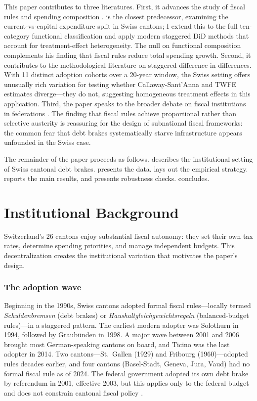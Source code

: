 \documentclass[12pt]{article}
\begin{document}
This paper contributes to three literatures. First, it advances the study of fiscal rules and spending composition \citep{baskaran2016revenue, poterba1994state, alesina2008fiscal}. \citet{baskaran2016revenue} is the closest predecessor, examining the current-vs-capital expenditure split in Swiss cantons; I extend this to the full ten-category functional classification and apply modern staggered DiD methods that account for treatment-effect heterogeneity. The null on functional composition complements his finding that fiscal rules reduce total spending growth. Second, it contributes to the methodological literature on staggered difference-in-differences. With 11 distinct adoption cohorts over a 20-year window, the Swiss setting offers unusually rich variation for testing whether Callaway-Sant'Anna and TWFE estimates diverge---they do not, suggesting homogeneous treatment effects in this application. Third, the paper speaks to the broader debate on fiscal institutions in federations \citep{rodden2006hamiltons, eyraud2018calibrating}. The finding that fiscal rules achieve proportional rather than selective austerity is reassuring for the design of subnational fiscal frameworks: the common fear that debt brakes systematically starve infrastructure appears unfounded in the Swiss case.

The remainder of the paper proceeds as follows.  describes the institutional setting of Swiss cantonal debt brakes.  presents the data.  lays out the empirical strategy.  reports the main results, and  presents robustness checks.  concludes.


\section{Institutional Background}\label{sec:background}

Switzerland's 26 cantons enjoy substantial fiscal autonomy: they set their own tax rates, determine spending priorities, and manage independent budgets. This decentralization creates the institutional variation that motivates the paper's design.

\subsubsection*{The adoption wave} Beginning in the 1990s, Swiss cantons adopted formal fiscal rules---locally termed \textit{Schuldenbremsen} (debt brakes) or \textit{Haushaltgleichgewichtsregeln} (balanced-budget rules)---in a staggered pattern. The earliest modern adopter was Solothurn in 1994, followed by Graub\"{u}nden in 1998. A major wave between 2001 and 2006 brought most German-speaking cantons on board, and Ticino was the last adopter in 2014. Two cantons---St.\ Gallen (1929) and Fribourg (1960)---adopted rules decades earlier, and four cantons (Basel-Stadt, Geneva, Jura, Vaud) had no formal fiscal rule as of 2024. The federal government adopted its own debt brake by referendum in 2001, effective 2003, but this applies only to the federal budget and does not constrain cantonal fiscal policy \citep{feld2008fiscal}.
\end{document}
